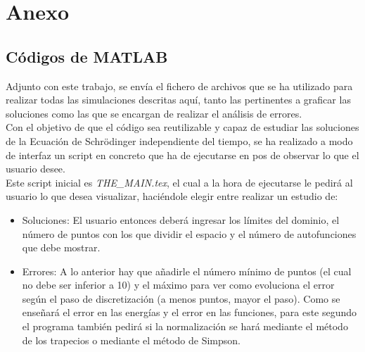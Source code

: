 \documentclass[12pt]{article}
\begin{document}
\newpage
\section{Anexo}
\subsection{Códigos de MATLAB}
Adjunto con este trabajo, se envía el fichero de archivos que se ha utilizado para realizar todas las simulaciones descritas aquí, tanto las pertinentes a graficar las soluciones como las que se encargan de realizar el análisis de errores.\\

Con el objetivo de que el código sea reutilizable y capaz de estudiar las soluciones de la Ecuación de Schrödinger independiente del tiempo, se ha realizado a modo de interfaz un script en concreto que ha de ejecutarse en pos de observar lo que el usuario desee.\\

Este script inicial es \textit{THE\_MAIN.tex}, el cual a la hora de ejecutarse le pedirá al usuario lo que desea visualizar, haciéndole elegir entre realizar un estudio de:

\begin{itemize}
    \item Soluciones: El usuario entonces deberá ingresar los límites del dominio, el número de puntos con los que dividir el espacio y el número de autofunciones que debe mostrar.

    \item Errores: A lo anterior hay que añadirle el número mínimo de puntos (el cual no debe ser inferior a 10) y el máximo para ver como evoluciona el error según el paso de discretización (a menos puntos, mayor el paso). Como se enseñará el error en las energías y el error en las funciones, para este segundo el programa también pedirá si la normalización se hará mediante el método de los trapecios o mediante el método de Simpson.

\end{itemize}
\end{document}
